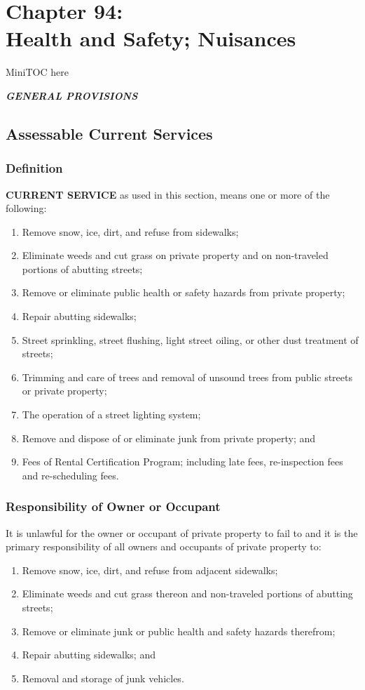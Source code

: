 \documentclass[code.tex]{subfiles}
\begin{document}
\chapter*{Chapter 94: \\
	Health and Safety; Nuisances}

MiniTOC here
\pagebreak

\begin{center}
\emph{\textbf{\LARGE{GENERAL PROVISIONS}}}
\end{center}
\section{Assessable Current Services}
\subsection{Definition}
\textbf{CURRENT SERVICE} as used in this section, means one or more of the following: 
\begin{enumerate}[{\indent}1)]
    \item Remove snow, ice, dirt, and refuse from sidewalks; 
    \item Eliminate weeds and cut grass on private property and on non-traveled portions of abutting streets; 
    \item Remove or eliminate public health or safety hazards from private property; 
    \item Repair abutting sidewalks; 
    \item Street sprinkling, street flushing, light street oiling, or other dust treatment of streets; 
    \item Trimming and care of trees and removal of unsound trees from public streets or private property; 
    \item The operation of a street lighting system; 
    \item Remove and dispose of or eliminate junk from private property; and
    \item Fees of Rental Certification Program; including late fees, re-inspection fees and re-scheduling fees.
\end{enumerate}
\subsection{Responsibility of Owner or Occupant}
It is unlawful for the owner or occupant of private property to fail to and it is the primary responsibility of all owners and occupants of private property to: 
\begin{enumerate}[{\indent}1)]
    \item Remove snow, ice, dirt, and refuse from adjacent sidewalks; 
    \item Eliminate weeds and cut grass thereon and non-traveled portions of abutting streets; 
    \item Remove or eliminate junk or public health and safety hazards therefrom; 
    \item Repair abutting sidewalks; and
    \item Removal and storage of junk vehicles.
\end{enumerate}
\end{document}
